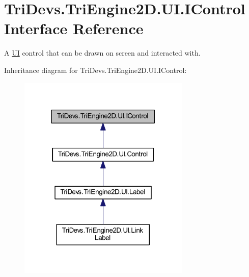 \hypertarget{interface_tri_devs_1_1_tri_engine2_d_1_1_u_i_1_1_i_control}{\section{Tri\-Devs.\-Tri\-Engine2\-D.\-U\-I.\-I\-Control Interface Reference}
\label{interface_tri_devs_1_1_tri_engine2_d_1_1_u_i_1_1_i_control}
}


A \hyperlink{namespace_tri_devs_1_1_tri_engine2_d_1_1_u_i}{U\-I} control that can be drawn on screen and interacted with.  




Inheritance diagram for Tri\-Devs.\-Tri\-Engine2\-D.\-U\-I.\-I\-Control\-:
\nopagebreak
\begin{figure}[H]
\begin{center}
\leavevmode
\includegraphics[width=232pt]{interface_tri_devs_1_1_tri_engine2_d_1_1_u_i_1_1_i_control__inherit__graph}
\end{center}
\end{figure}
